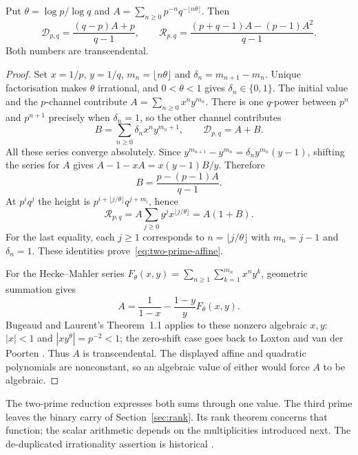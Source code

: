\documentclass[11pt]{article}
\begin{document}
\begin{theorem}
\label{res:two-prime-transcendence}
\label{res:two-prime-repeated-transcendence}
Put $\theta=\log p/\log q$ and
$A=\sum_{n\ge0}p^{-n}q^{-\lfloor n\theta\rfloor}$.  Then
\begin{equation}\label{eq:two-prime-affine}
 \mathcal D_{p,q}=\frac{(q-p)A+p}{q-1},\qquad
 \mathcal R_{p,q}=\frac{(p+q-1)A-(p-1)A^2}{q-1}.
\end{equation}
Both numbers are transcendental.
\end{theorem}
\begin{proof}
Set $x=1/p$, $y=1/q$, $m_n=\lfloor n\theta\rfloor$ and
$\delta_n=m_{n+1}-m_n$.  Unique factorisation makes $\theta$ irrational,
and $0<\theta<1$ gives $\delta_n\in\{0,1\}$.  The initial value and the
$p$-channel contribute $A=\sum_{n\ge0}x^ny^{m_n}$.  There is one $q$-power
between $p^n$ and $p^{n+1}$ precisely when $\delta_n=1$, so the other
channel contributes
\[
 B=\sum_{n\ge0}\delta_nx^ny^{m_n+1},\qquad \mathcal D_{p,q}=A+B.
\]
All these series converge absolutely.  Since
$y^{m_{n+1}}-y^{m_n}=\delta_ny^{m_n}(y-1)$, shifting the series for $A$
gives $A-1-xA=x(y-1)B/y$.  Therefore
\[
 B=\frac{p-(p-1)A}{q-1}.
\]
At $p^iq^j$ the height is
$p^{i+\lfloor j/\theta\rfloor}q^{j+m_i}$, hence
\[
 \mathcal R_{p,q}
 =A\sum_{j\ge0}y^jx^{\lfloor j/\theta\rfloor}=A(1+B).
\]
For the last equality, each $j\ge1$ corresponds to
$n=\lfloor j/\theta\rfloor$ with $m_n=j-1$ and $\delta_n=1$.
These identities prove~\eqref{eq:two-prime-affine}.

For the Hecke--Mahler series
$F_\theta(x,y)=\sum_{n\ge1}\sum_{k=1}^{m_n}x^ny^k$, geometric summation gives
\begin{equation}\label{eq:hecke-mahler-boundary}
 A=\frac1{1-x}-\frac{1-y}{y}F_\theta(x,y).
\end{equation}
Bugeaud and Laurent's Theorem~1.1 applies to these nonzero algebraic $x,y$:
$|x|<1$ and $|xy^\theta|=p^{-2}<1$; the zero-shift case goes back to
Loxton and van der Poorten
\cite{bugeaudlaurent2023,loxtonvdp1977}.  Thus $A$ is transcendental.
The displayed affine and quadratic polynomials are nonconstant, so an
algebraic value of either would force $A$ to be algebraic.
\end{proof}

The two-prime reduction expresses both sums through one value.  The third
prime leaves the binary carry of Section~\ref{sec:rank}.  Its rank theorem
concerns that function; the scalar arithmetic depends on the multiplicities
introduced next.  The de-duplicated irrationality assertion is historical
\cite{erdos1974letter}.
\end{document}
